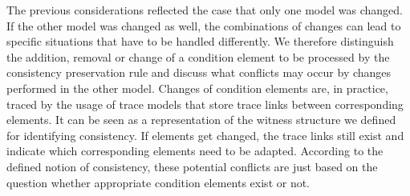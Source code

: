 The previous considerations reflected the case that only one model was changed.
If the other model was changed as well, the combinations of changes can lead to specific situations that have to be handled differently.
We therefore distinguish the addition, removal or change of a condition element to be processed by the consistency preservation rule and discuss what conflicts may occur by changes performed in the other model.
Changes of condition elements are, in practice, traced by the usage of trace models that store trace links between corresponding elements.
It can be seen as a representation of the witness structure we defined for identifying consistency.
If elements get changed, the trace links still exist and indicate which corresponding elements need to be adapted.
According to the defined notion of consistency, these potential conflicts are just based on the question whether appropriate condition elements exist or not.
